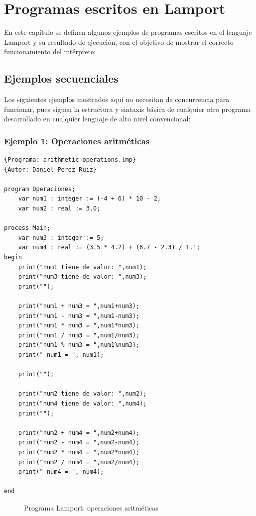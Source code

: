 \chapter{\textbf{Programas escritos en Lamport}}
En este capítulo se definen algunos ejemplos de programas escritos en el lenguaje Lamport y su resultado de ejecución, con el objetivo de mostrar el correcto funcionamiento del intérprete:

\section{Ejemplos secuenciales}
Los siguientes ejemplos mostrados aquí no necesitan de concurrencia para funcionar, pues siguen la estructura y sintaxis básica de cualquier otro programa desarrollado en cualquier lenguaje de alto nivel convencional:

\subsection{Ejemplo 1: Operaciones aritméticas}
\begin{lstlisting}[style=lamportStyle]
{Programa: arithmetic_operations.lmp}
{Autor: Daniel Perez Ruiz}

program Operaciones;
	var num1 : integer := (-4 + 6) * 10 - 2;
	var num2 : real := 3.0;

process Main;
	var num3 : integer := 5;
	var num4 : real := (3.5 * 4.2) + (6.7 - 2.3) / 1.1;
begin
	print("num1 tiene de valor: ",num1);
	print("num3 tiene de valor: ",num3);
	print("");
	
	print("num1 + num3 = ",num1+num3);
	print("num1 - num3 = ",num1-num3);
	print("num1 * num3 = ",num1*num3);
	print("num1 / num3 = ",num1/num3);
	print("num1 % num3 = ",num1%num3);
	print("-num1 = ",-num1);
	
	print("");
	
	print("num2 tiene de valor: ",num2);
	print("num4 tiene de valor: ",num4);	
	print("");
	
	print("num2 + num4 = ",num2+num4);
	print("num2 - num4 = ",num2-num4);
	print("num2 * num4 = ",num2*num4);
	print("num2 / num4 = ",num2/num4);
	print("-num4 = ",-num4);
	
end
\end{lstlisting}
\begin{figure}[h]
\caption{Programa Lamport: operaciones aritméticas}
\label{fig:lamportArithmeticOperations}
\end{figure}

